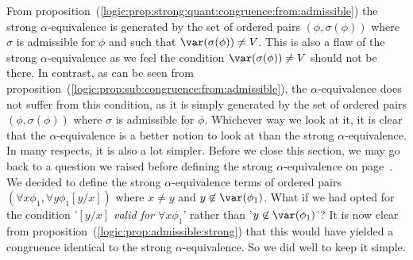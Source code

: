 From
proposition~(\ref{logic:prop:strong:quant:congruence:from:admissible})
the strong $\alpha$-equivalence is generated by the set of
ordered pairs $(\phi,\sigma(\phi))$ where $\sigma$ is admissible for
$\phi$ and such that $\var(\sigma(\phi))\neq V$. This is also a flaw
of the strong $\alpha$-equivalence as we feel the condition
$\var(\sigma(\phi))\neq V$ should not be there. In contrast, as can
be seen from
proposition~(\ref{logic:prop:sub:congruence:from:admissible}), the 
$\alpha$-equivalence does not suffer from this condition, as it
is simply generated by the set of ordered pairs
$(\phi,\sigma(\phi))$ where $\sigma$ is admissible for $\phi$.
Whichever way we look at it, it is clear that the $\alpha$-equivalence 
is a better notion to look at than the strong $\alpha$-equivalence. 
In many respects, it is also a lot simpler. Before we close this section, 
we may go back to a question we raised before defining the 
strong $\alpha$-equivalence on
page~\pageref{logic:def:strong:sub:congruence}. We decided to define
the strong $\alpha$-equivalence terms of ordered pairs $(\forall
x\phi_{1},\forall y\phi_{1}[y/x])$ where $x\neq y$ and
$y\not\in\var(\phi_{1})$. What if we had opted for the condition
'{\em $[y/x]$ valid for $\forall x\phi_{1}$}' rather than
'$y\not\in\var(\phi_{1})$'? It is now clear from
proposition~(\ref{logic:prop:admissible:strong}) that this would
have yielded a congruence identical to the strong $\alpha$-equivalence. 
So we did well to keep it simple.
